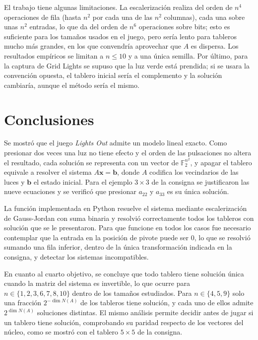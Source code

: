 \documentclass[12pt,a4paper]{article}
\theoremstyle{plain}
\theoremstyle{definition}
\theoremstyle{remark}
\newcommand{\F}{\mathbb{F}_2}
\begin{document}
El trabajo tiene algunas limitaciones. La escalerización realiza del orden de $n^4$ operaciones de fila (hasta $n^2$ por cada una de las $n^2$ columnas), cada una sobre unas $n^2$ entradas, lo que da del orden de $n^6$ operaciones sobre bits; esto es suficiente para los tamaños usados en el juego, pero sería lento para tableros mucho más grandes, en los que convendría aprovechar que $A$ es dispersa. Los resultados empíricos se limitan a $n\leq 10$ y a una única semilla. Por último, para la captura de Grid Lights se supuso que la luz verde está prendida; si se usara la convención opuesta, el tablero inicial sería el complemento y la solución cambiaría, aunque el método sería el mismo.

\section{Conclusiones}\label{sec:conclusiones}

Se mostró que el juego \textit{Lights Out} admite un modelo lineal exacto. Como presionar dos veces una luz no tiene efecto y el orden de las pulsaciones no altera el resultado, cada solución se representa con un vector de $\F^{n^2}$, y apagar el tablero equivale a resolver el sistema $A\mathbf{x}=\mathbf{b}$, donde $A$ codifica los vecindarios de las luces y $\mathbf{b}$ el estado inicial. Para el ejemplo $3\times 3$ de la consigna se justificaron las nueve ecuaciones y se verificó que presionar $a_{22}$ y $a_{33}$ es su única solución.

La función implementada en Python resuelve el sistema mediante escalerización de Gauss-Jordan con suma binaria y resolvió correctamente todos los tableros con solución que se le presentaron. Para que funcione en todos los casos fue necesario contemplar que la entrada en la posición de pivote puede ser 0, lo que se resolvió sumando una fila inferior, dentro de la única transformación indicada en la consigna, y detectar los sistemas incompatibles.

En cuanto al cuarto objetivo, se concluye que todo tablero tiene solución única cuando la matriz del sistema es invertible, lo que ocurre para $n\in\{1,2,3,6,7,8,10\}$ dentro de los tamaños estudiados. Para $n\in\{4,5,9\}$ solo una fracción $2^{-\dim N(A)}$ de los tableros tiene solución, y cada uno de ellos admite $2^{\dim N(A)}$ soluciones distintas. El mismo análisis permite decidir antes de jugar si un tablero tiene solución, comprobando su paridad respecto de los vectores del núcleo, como se mostró con el tablero $5\times 5$ de la consigna.
\end{document}
